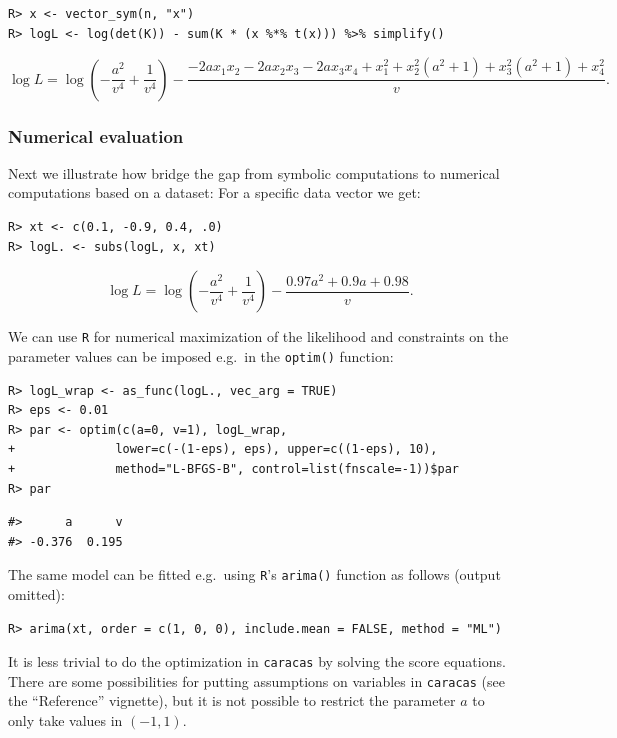 \begin{verbatim}
R> x <- vector_sym(n, "x")
R> logL <- log(det(K)) - sum(K * (x %*% t(x))) %>% simplify()
\end{verbatim}

\[
\log L = \log{\left(- \frac{a^{2}}{v^{4}} + \frac{1}{v^{4}} \right)} - \frac{- 2 a x_{1} x_{2} - 2 a x_{2} x_{3} - 2 a x_{3} x_{4} + x_{1}^{2} + x_{2}^{2} \left(a^{2} + 1\right) + x_{3}^{2} \left(a^{2} + 1\right) + x_{4}^{2}}{v} .
\]

\hypertarget{numerical-evaluation}{%
\subsubsection{Numerical evaluation}\label{numerical-evaluation}}

Next we illustrate how bridge the gap from symbolic computations to numerical computations based on a dataset:
For a specific data vector we get:

\begin{verbatim}
R> xt <- c(0.1, -0.9, 0.4, .0)
R> logL. <- subs(logL, x, xt) 
\end{verbatim}

\[
\log L = \log{\left(- \frac{a^{2}}{v^{4}} + \frac{1}{v^{4}} \right)} - \frac{0.97 a^{2} + 0.9 a + 0.98}{v} .
\]

We can use \texttt{R} for numerical maximization of the likelihood and constraints on the
parameter values can be imposed e.g.~in the \texttt{optim()} function:

\begin{verbatim}
R> logL_wrap <- as_func(logL., vec_arg = TRUE)
R> eps <- 0.01
R> par <- optim(c(a=0, v=1), logL_wrap, 
+              lower=c(-(1-eps), eps), upper=c((1-eps), 10),
+              method="L-BFGS-B", control=list(fnscale=-1))$par
R> par
\end{verbatim}

\begin{verbatim}
#>      a      v 
#> -0.376  0.195
\end{verbatim}

The same model can be fitted e.g.~using \texttt{R}'s \texttt{arima()} function as follows (output omitted):

\begin{verbatim}
R> arima(xt, order = c(1, 0, 0), include.mean = FALSE, method = "ML")
\end{verbatim}

It is less trivial to do the optimization in \texttt{caracas} by solving the score equations.
There are some possibilities for putting assumptions on variables
in \texttt{caracas} (see the ``Reference'' vignette), but
it is not possible to restrict the parameter \(a\) to only take values in \((-1, 1)\).

